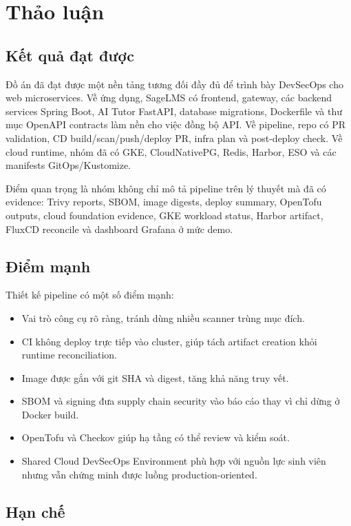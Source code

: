 \chapter{Thảo luận}
\label{chap:discussion}

\section{Kết quả đạt được}

Đồ án đã đạt được một nền tảng tương đối đầy đủ để trình bày DevSecOps cho web microservices. Về ứng dụng, SageLMS có frontend, gateway, các backend services Spring Boot, AI Tutor FastAPI, database migrations, Dockerfile và thư mục OpenAPI contracts làm nền cho việc đồng bộ API. Về pipeline, repo có PR validation, CD build/scan/push/deploy PR, infra plan và post-deploy check. Về cloud runtime, nhóm đã có GKE, CloudNativePG, Redis, Harbor, ESO và các manifests GitOps/Kustomize.

Điểm quan trọng là nhóm không chỉ mô tả pipeline trên lý thuyết mà đã có evidence: Trivy reports, SBOM, image digests, deploy summary, OpenTofu outputs, cloud foundation evidence, GKE workload status, Harbor artifact, FluxCD reconcile và dashboard Grafana ở mức demo.

\section{Điểm mạnh}

Thiết kế pipeline có một số điểm mạnh:

\begin{itemize}
  \item Vai trò công cụ rõ ràng, tránh dùng nhiều scanner trùng mục đích.
  \item CI không deploy trực tiếp vào cluster, giúp tách artifact creation khỏi runtime reconciliation.
  \item Image được gắn với git SHA và digest, tăng khả năng truy vết.
  \item SBOM và signing đưa supply chain security vào báo cáo thay vì chỉ dừng ở Docker build.
  \item OpenTofu và Checkov giúp hạ tầng có thể review và kiểm soát.
  \item Shared Cloud DevSecOps Environment phù hợp với nguồn lực sinh viên nhưng vẫn chứng minh được luồng production-oriented.
\end{itemize}

\section{Hạn chế}

